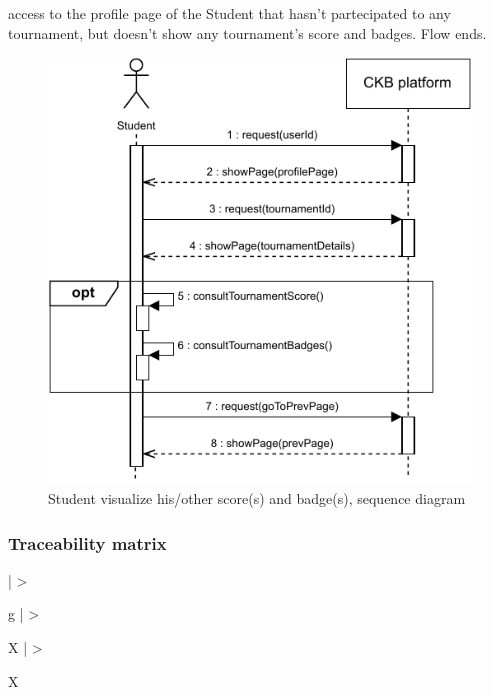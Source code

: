 \documentclass{article}
\begin{document}
{\begin{enumerate}
\begin{xltabular}{\textwidth}
\begin{itemize}
\begin{itemize}
                                                        access to the profile page of the Student that hasn't partecipated
                                                        to any tournament, but doesn't show any tournament's score and badges.
                                                        Flow ends.
                                                    \end{itemize} 
                                                \end{itemize}
                    \end{xltabular}
                    
                    \begin{figure}[H]
                        \centering
                        \includegraphics[scale=0.95]{images/SequenceDiagrams/Sequence13.pdf}
                        \caption{Student visualize his/other score(s) and badge(s), sequence diagram}
                        \label{fig:ScoresBadgesVisualizationSeqDiagram}
                    \end{figure}
            \end{enumerate}
        \subsubsection{Traceability matrix}
            \begin{xltabular}{\textwidth}
                {| >{\raggedright\arraybackslash}g | >{\raggedright\arraybackslash}X | >{\raggedright\arraybackslash}X }
                    \hline
                    \endfirsthead
                    \hline
                    \endhead
                    \endfoot
                    \hline
                    \endlastfoot


\end{xltabular}}
\end{document}
